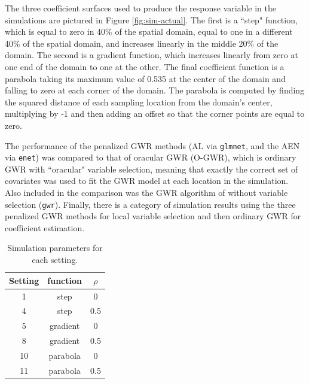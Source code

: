 \documentclass[authoryear, review, 11pt]{elsarticle}
\begin{document}
	The three coefficient surfaces used to produce the response variable in the simulations are pictured in Figure \ref{fig:sim-actual}. The first is a ``step" function, which is equal to zero in 40\% of the spatial domain, equal to one in a different 40\% of the spatial domain, and increases linearly in the middle 20\% of the domain. The second is a gradient function, which increases linearly from zero at one end of the domain to one at the other. The final coefficient function is a parabola taking its maximum value of 0.535 at the center of the domain and falling to zero at each corner of the domain. The parabola is computed by finding the squared distance of each sampling location from the domain's center, multiplying by -1 and then adding an offset so that the corner points are equal to zero.
	
	The performance of the penalized GWR methods (AL via {\tt glmnet}, and the AEN  via {\tt enet}) was compared to that of oracular GWR (O-GWR), which is ordinary GWR with ``oracular" variable selection, meaning that exactly the correct set of covariates was used to fit the GWR model at each location in the simulation. Also included in the comparison was the GWR algorithm of \cite{Fotheringham:2002} without variable selection ({\tt gwr}). Finally, there is a category of simulation results using the three penalized GWR methods for local variable selection and then ordinary GWR for coefficient estimation.
	
\begin{table}[h!]
	\begin{center}
	\begin{tabular}{ccc}
		\hline
		Setting & function & $\rho$ \\ 
		\hline
		1 & step & 0 \\ 
		4 & step & 0.5 \\ 
		\hline
		5 & gradient & 0 \\ 
		8 & gradient & 0.5 \\ 
		\hline
		10 & parabola & 0 \\ 
		11 & parabola & 0.5 \\ 
	\end{tabular}
	\end{center}
	\caption{Simulation parameters for each setting.\label{table:simulation_settings}}
\end{table}
\end{document}
